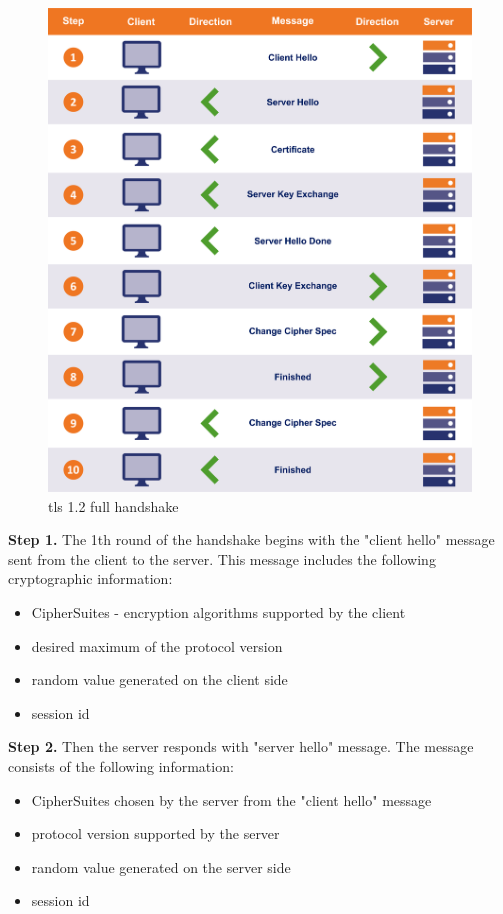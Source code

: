 \begin{figure}[H]
	\centering
		\includegraphics[scale=0.35]{images/handshake1_2.png}
	\caption{\gls{tls} 1.2 full handshake \cite{sslstore:handshake}}
	\label{fig:handshake1_2}
\end{figure}

\textbf{Step 1.} The 1th round of the handshake begins with the "client hello" message sent from the client to the server. This message includes the following cryptographic information:

\begin{itemize}
	\item CipherSuites - encryption algorithms supported by the client
	\item desired maximum of the protocol version
	\item random value generated on the client side
	\item session id
\end{itemize}

\textbf{Step 2.} Then the server responds with "server hello" message. The message consists of the following information:

\begin{itemize}
	\item CipherSuites chosen by the server from the "client hello" message
	\item protocol version supported by the server
	\item random value generated on the server side
	\item session id
\end{itemize}

